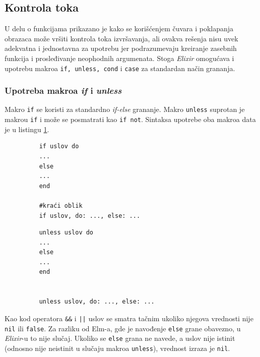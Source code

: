 \documentclass[12pt,oneside]{memoir}
\begin{document}
\subsection{Kontrola toka}
U delu o funkcijama prikazano je kako se korišćenjem čuvara i poklapanja obrazaca može
vršiti kontrola toka izvršavanja, ali ovakva rešenja nisu uvek adekvatna i jednostavna za
upotrebu jer podrazumevaju kreiranje zasebnih funkcija i prosleđivanje neophodnih
argumenata. Stoga \emph{Elixir} omogućava i upotrebu makroa \texttt{if, unless, cond} i
\texttt{case} za standardan način grananja.

\subsubsection{Upotreba makroa \emph{if} i \emph{unless}}
Makro \texttt{if} se koristi za standardno \emph{if-else} grananje. Makro \texttt{unless} suprotan
je makrou \texttt{if} i može se posmatrati kao \texttt{if not}. Sintaksa upotrebe oba makroa data je u listingu
\ref{listing:elixirIf}. 
\begin{figure}[!h]
\begin{minipage}{0.5\textwidth} 
  \centering
  \begin{verbatim}
    if uslov do
    ...
    else
    ...
    end
    
    #kraći oblik
    if uslov, do: ..., else: ...
  \end{verbatim}
\end{minipage}
\begin{minipage}{0.5\textwidth}
  \centering
  \begin{verbatim}
    unless uslov do
    ...
    else
    ...
    end
    

    unless uslov, do: ..., else: ...
  \end{verbatim}
\end{minipage}
\label{listing:elixirIf}
\end{figure}
  
Kao kod operatora \texttt{\&\&} i \texttt{||} uslov se smatra tačnim ukoliko njegova vrednosti
nije \texttt{nil} ili \texttt{false}. Za razliku od Elm-a, gde je navođenje \texttt{else} grane
obavezno, u \emph{Elixir}-u to nije slučaj. Ukoliko se \texttt{else} grana ne navede, a uslov nije istinit
(odnosno nije neistinit u slučaju makroa \texttt{unless}), vrednost izraza je \texttt{nil}.
\end{document}
